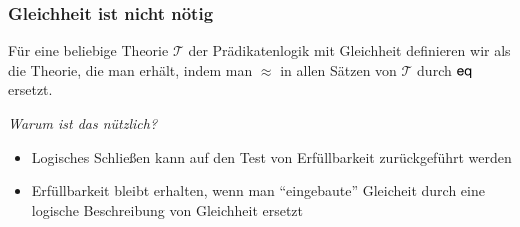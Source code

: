 \documentclass[onlymath]{beamer}
\begin{document}
\begin{frame}\frametitle{Gleichheit ist nicht nötig}

Für eine beliebige Theorie $\mathcal{T}$ der Prädikatenlogik mit Gleichheit
definieren wir  als die Theorie, die man erhält,
indem man $\approx$ in allen Sätzen von $\mathcal{T}$ durch $\textsf{eq}$ ersetzt.
\bigskip

\pause

\emph{Warum ist das nützlich?}
\begin{itemize}
\item Logisches Schließen kann auf den Test von Erfüllbarkeit zurückgeführt werden
\item Erfüllbarkeit bleibt erhalten, wenn man "`eingebaute"' Gleicheit durch eine logische 
Beschreibung von Gleichheit ersetzt
\end{itemize}

\end{frame}
\end{document}
